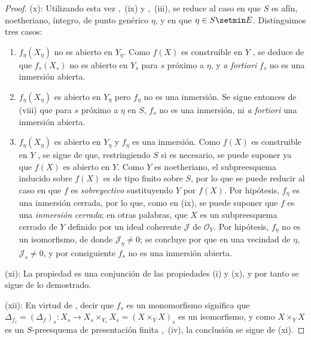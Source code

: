 \begin{proof}
(x): Utilizando esta vez ,~(ix) y ,~(iii), se reduce al caso en que $S$ es afín, noetheriano, íntegro, de punto genérico $\eta$, y en que $\eta\in S\setmin E$.
Distinguimos tres casos:
\begin{enumerate}[label=\upshape{$\arabic{enumi}^\circ$}]
  \item $f_\eta(X_\eta)$ no es abierto en $Y_\eta$.
  Como $f(X)$ es construible en $Y$ , se deduce de  que $f_s(X_s)$ no es abierto en $Y_s$ para $s$ próximo a $\eta$, y \emph{a fortiori} $f_s$ no es una inmersión abierta.

  \item $f_\eta(X_\eta)$ es abierto en $Y_\eta$ pero $f_\eta$ no es una inmersión.
  Se sigue entonces de (viii) que para $s$ próximo a $\eta$ en $S$, $f_s$ no es una inmersión, ni \emph{a fortiori} una inmersión abierta.

  \item $f_\eta(X_\eta)$ es abierto en $Y_\eta$ y $f_\eta$ es una inmersión.
  Como $f(X)$ es construible en $Y$ , se sigue de  que, restringiendo $S$ si es necesario, se puede suponer ya que $f(X)$ es abierto en $Y$.
  Como $Y$ es noetheriano, el subpreesquema inducido sobre $f(X)$ es de tipo finito sobre $S$, por lo que se puede reducir al caso en que $f$ es \emph{sobreyectivo} sustituyendo $Y$ por $f(X)$.
  Por hipótesis, $f_\eta$ es una inmersión cerrada, por lo que, como en (ix), se puede suponer que $f$ es una \emph{inmersión cerrada}; en otras palabras, que $X$ es un subpreesquema cerrado de $Y$ definido por un ideal coherente $\mathcal J$ de $\mathcal O_Y$.
  Por hipótesis, $f_\eta$ no es un isomorfismo, de donde $\mathcal J_\eta\neq0$; se concluye por  que en una vecindad de $\eta$, $\mathcal J_s\neq0$, y por consiguiente $f_s$ no es una inmersión abierta.
\end{enumerate}

(xi): La propiedad es una conjunción de las propiedades (i) y (x), y por tanto se sigue de lo demostrado.

(xii): En virtud de , decir que $f_s$ es un monomorfismo significa que $\Delta_{f_s}=(\Delta_f)_s:X_s\to X_s\times_{Y_s}X_s=(X\times_YX)_s$ es un isomorfismo, y como $X\times_YX$ es un $S$-preesquema de presentación finita ,~(iv), la conclusión se sigue de (xi).
\end{proof}

